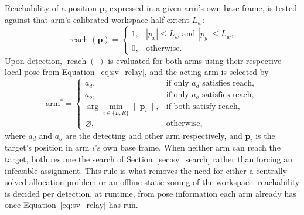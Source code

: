 Reachability of a position $\mathbf{p}$, expressed in a given arm's own base frame, is tested
against that arm's calibrated workspace half-extent $L_w$:
\begin{equation}
\operatorname{reach}(\mathbf{p}) =
\begin{cases}
1, & |p_x| \leq L_w \text{ and } |p_y| \leq L_w, \\
0, & \text{otherwise}.
\end{cases}
\label{eq:sv_reach}
\end{equation}
Upon detection, $\operatorname{reach}(\cdot)$ is evaluated for both arms using their respective
local pose from Equation~\eqref{eq:sv_relay}, and the acting arm is selected by
\begin{equation}
\text{arm}^{*} =
\begin{cases}
a_d, & \text{if only } a_d \text{ satisfies reach}, \\
a_o, & \text{if only } a_o \text{ satisfies reach}, \\
\displaystyle\arg\min_{i \in \{L, R\}} \lVert \mathbf{p}_i \rVert, & \text{if both satisfy reach}, \\
\varnothing, & \text{otherwise},
\end{cases}
\label{eq:sv_roleassign}
\end{equation}
where $a_d$ and $a_o$ are the detecting and other arm respectively, and $\mathbf{p}_i$ is the
target's position in arm $i$'s own base frame. When neither arm can reach the target, both resume
the search of Section~\ref{sec:sv_search} rather than forcing an infeasible assignment. This rule
is what removes the need for either a centrally solved allocation problem or an offline static
zoning of the workspace: reachability is decided per detection, at runtime, from pose information
each arm already has once Equation~\eqref{eq:sv_relay} has run.

